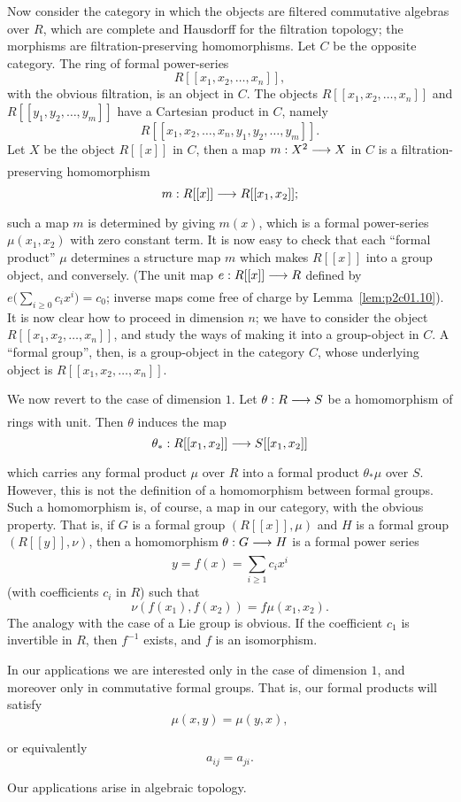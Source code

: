 \documentclass[../main]{subfiles}
\begin{document}
Now consider the category in which the objects are filtered commutative algebras over $R$, which are complete and Hausdorff for the filtration topology; the morphisms are filtration-preserving homomorphisms. Let $C$ be the opposite category. The ring of formal power-series \[R[[x_1, x_2, \ldots, x_n]],\] with the obvious filtration, is an object in $C$. The objects $R[[x_1, x_2, \ldots, x_n]]$ and $R[[y_1, y_2, \ldots, y_m]]$ have a Cartesian product in $C$, namely \[R[[x_1, x_2, \ldots, x_n, y_1, y_2, \ldots, y_m]].\] Let $X$ be the object $R[[x]]$ in $C$, then a map $m : X^2 \lar{} X$ in $C$ is a filtration-preserving homomorphism \[m : R[[x]] \lar{} R[[x_1, x_2]];\] such a map $m$ is determined by giving $m(x)$, which is a formal power-series $\mu(x_1, x_2)$ with zero constant term. It is now easy to check that each ``formal product'' $\mu$ determines a structure map $m$ which makes $R[[x]]$ into a group object, and conversely. (The unit map $e : R[[x]] \lar{} R$ defined by $\displaystyle e \Big(\sum_{i \ge 0} c_i x^i\Big) = c_0$; inverse  maps come free of charge by Lemma~\ref{lem:p2c01.10}). It is now clear how to proceed in dimension $n$; we have to consider the object $R[[x_1, x_2, \ldots, x_n]]$, and study the ways of making it into a group-object in $C$. A ``formal group'', then, is a group-object in the category $C$, whose underlying object is $R[[x_1, x_2, \ldots, x_n]]$.

We now revert to the case of dimension $1$. Let $\theta : R \lar{} S$ be a homomorphism of rings with unit. Then $\theta$ induces the map \[\theta_\ast : R[[x_1, x_2]] \lar{} S[[x_1, x_2]]\] which carries any formal product $\mu$ over $R$ into a formal product $\theta_\ast \mu$ over $S$. However, this is not the definition of a homomorphism between formal groups. Such a homomorphism is, of course, a map in our category, with the obvious property. That is, if $G$ is a formal group $(R[[x]], \mu)$ and $H$ is a formal group $(R[[y]], \nu)$, then a homomorphism $\theta : G \lar{} H$ is a formal power series \[y = f(x) = \sum_{i \ge 1} c_i x^i\] (with coefficients $c_i$ in $R$) such that \[\nu(f(x_1), f(x_2)) = f\mu(x_1, x_2).\] The analogy with the case of a Lie group is obvious. If the coefficient $c_1$ is invertible in $R$, then $f^{-1}$ exists, and $f$ is an isomorphism.

In our applications we are interested only in the case of dimension $1$, and moreover only in commutative formal groups. That is, our formal products will satisfy 
\begin{equation}
\tag{1.11}
\label{eqn:p2c01.11}
\mu(x, y) = \mu(y, x),
\end{equation}

or equivalently
\begin{equation}
\tag{1.12}
\label{eqn:p2c01.12}
a_{ij} = a_{ji}.
\end{equation}

Our applications arise in algebraic topology.
\end{document}
